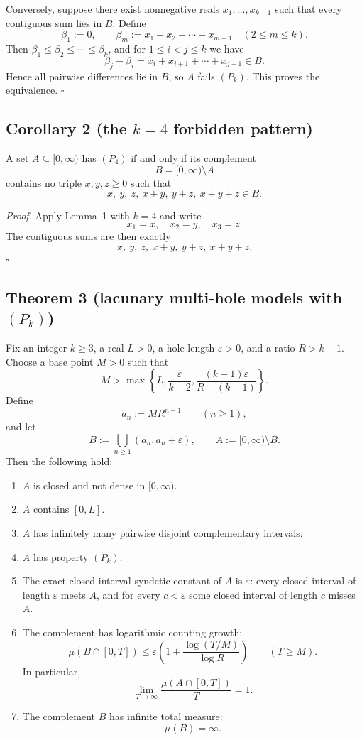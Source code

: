 Conversely, suppose there exist nonnegative reals $x_1,\dots,x_{k-1}$ such that every contiguous sum lies in $B$.
Define
\[
\beta_1:=0,
\qquad
\beta_m:=x_1+x_2+\cdots+x_{m-1}
\quad (2\le m\le k).
\]
Then $\beta_1\le\beta_2\le\cdots\le\beta_k$, and for $1\le i<j\le k$ we have
\[
\beta_j-\beta_i=x_i+x_{i+1}+\cdots+x_{j-1}\in B.
\]
Hence all pairwise differences lie in $B$, so $A$ fails $(P_k)$.
This proves the equivalence.
\hfill$\square$

\subsection*{Corollary 2 (the $k=4$ forbidden pattern)}
A set $A\subseteq[0,\infty)$ has $(P_4)$ if and only if its complement
\[
B=[0,\infty)\setminus A
\]
contains no triple $x,y,z\ge 0$ such that
\[
 x,\ y,\ z,\ x+y,\ y+z,\ x+y+z\in B.
\]

\medskip
\noindent\emph{Proof.}
Apply Lemma~1 with $k=4$ and write
\[
 x_1=x,\quad x_2=y,\quad x_3=z.
\]
The contiguous sums are then exactly
\[
 x,\ y,\ z,\ x+y,\ y+z,\ x+y+z.
\]
\hfill$\square$

\subsection*{Theorem 3 (lacunary multi-hole models with $(P_k)$)}
Fix an integer $k\ge 3$, a real $L>0$, a hole length $\varepsilon>0$, and a ratio $R>k-1$.
Choose a base point $M>0$ such that
\[
M>\max\left\{L,\frac{\varepsilon}{k-2},\frac{(k-1)\varepsilon}{R-(k-1)}\right\}.
\]
Define
\[
 a_n:=MR^{n-1}\qquad (n\ge 1),
\]
and let
\[
 B:=\bigcup_{n\ge 1}(a_n,a_n+\varepsilon),
 \qquad
 A:=[0,\infty)\setminus B.
\]
Then the following hold:

\begin{enumerate}
\item $A$ is closed and not dense in $[0,\infty)$.
\item $A$ contains $[0,L]$.
\item $A$ has infinitely many pairwise disjoint complementary intervals.
\item $A$ has property $(P_k)$.
\item The exact closed-interval syndetic constant of $A$ is $\varepsilon$: every closed interval of length $\varepsilon$ meets $A$, and for every $c<\varepsilon$ some closed interval of length $c$ misses $A$.
\item The complement has logarithmic counting growth:
\[
\mu(B\cap[0,T])\le \varepsilon\left(1+\frac{\log(T/M)}{\log R}\right)
\qquad (T\ge M).
\]
In particular,
\[
\lim_{T\to\infty}\frac{\mu(A\cap[0,T])}{T}=1.
\]
\item The complement $B$ has infinite total measure:
\[
\mu(B)=\infty.
\]
\end{enumerate}

